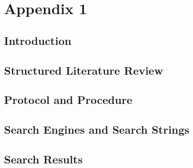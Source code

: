 
\chapter{Appendix 1}
\label{appendix:slrreport}
\section{Introduction}


\section{Structured Literature Review}


\section{Protocol and Procedure}


\section{Search Engines and Search Strings}


\section{Search Results}


\clearpage
{}
